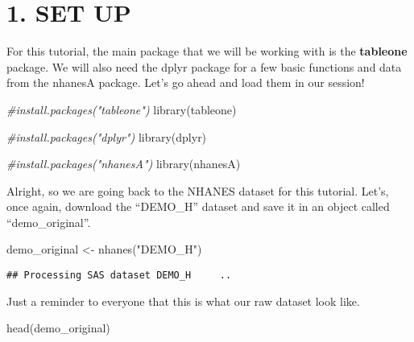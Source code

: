 \documentclass[
]{book}
\newenvironment{Shaded}{\begin{snugshade}}{\end{snugshade}}
\newcommand{\CommentTok}[1]{\textcolor[rgb]{0.56,0.35,0.01}{\textit{#1}}}
\newcommand{\FunctionTok}[1]{\textcolor[rgb]{0.00,0.00,0.00}{#1}}
\newcommand{\NormalTok}[1]{#1}
\newcommand{\OtherTok}[1]{\textcolor[rgb]{0.56,0.35,0.01}{#1}}
\newcommand{\StringTok}[1]{\textcolor[rgb]{0.31,0.60,0.02}{#1}}
\begin{document}
\hypertarget{set-up-4}{%
\section{1. SET UP}\label{set-up-4}}

For this tutorial, the main package that we will be working with is the \textbf{tableone} package. We will also need the dplyr package for a few basic functions and data from the nhanesA package. Let's go ahead and load them in our session!

\begin{Shaded}
\begin{Highlighting}[]
\CommentTok{\#install.packages("tableone")}
\FunctionTok{library}\NormalTok{(tableone)}

\CommentTok{\#install.packages("dplyr")}
\FunctionTok{library}\NormalTok{(dplyr)}

\CommentTok{\#install.packages("nhanesA")}
\FunctionTok{library}\NormalTok{(nhanesA)}
\end{Highlighting}
\end{Shaded}

Alright, so we are going back to the NHANES dataset for this tutorial. Let's, once again, download the ``DEMO\_H'' dataset and save it in an object called ``demo\_original''.

\begin{Shaded}
\begin{Highlighting}[]
\NormalTok{demo\_original }\OtherTok{\textless{}{-}} \FunctionTok{nhanes}\NormalTok{(}\StringTok{"DEMO\_H"}\NormalTok{)}
\end{Highlighting}
\end{Shaded}

\begin{verbatim}
## Processing SAS dataset DEMO_H     ..
\end{verbatim}

Just a reminder to everyone that this is what our raw dataset look like.

\begin{Shaded}
\begin{Highlighting}[]
\FunctionTok{head}\NormalTok{(demo\_original)}
\end{Highlighting}
\end{Shaded}
\end{document}
